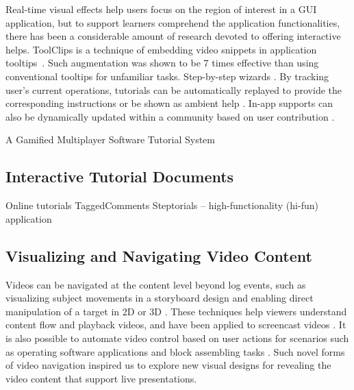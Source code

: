 Real-time visual effects help users focus on the region of interest in a GUI application, but to support learners comprehend the application functionalities, there has been a considerable amount of research devoted to offering interactive helps.
%
ToolClips is a technique of embedding video snippets in application tooltips~\cite{Grossman:2010wr}. Such augmentation was shown to be 7 times effective than using conventional tooltips for unfamiliar tasks. Step-by-step wizards \cite{Bergman:2005:DocWizards,Kelleher:2005:STD:1054972.1055047,Fernquist:2011:SRE:2047196.2047245}.
%
By tracking user's current operations, tutorials can be automatically replayed to provide the corresponding instructions \cite{Pongnumkul:2011ju} or be shown as ambient help \cite{Matejka:2011:AH:1978942.1979349}.
%
In-app supports can also be dynamically updated within a community based on user contribution \cite{Lafreniere:2013ff,Matejka:2009:CCR:1622176.1622214}.

A Gamified Multiplayer Software Tutorial System \cite{Li:2014:CGM:2556288.2556954}


\subsection{Interactive Tutorial Documents}

Online tutorials
TaggedComments \cite{Bunt:2014:TPI:2556288.2557118}
Steptorials \cite{Lieberman:2014:SML:2557500.2557543} -- high-functionality (hi-fun) application




\subsection{Visualizing and Navigating Video Content}
Videos can be navigated at the content level beyond log events, such as visualizing subject movements in a storyboard design \cite{goldman2006schematic} and enabling direct manipulation of a target in 2D \cite{Dragicevic:2008:VBD:1357054.1357096,Goldman:2008:VOA:1449715.1449719,Karrer:2008:DDM:1357054.1357097} or 3D \cite{Nguyen:2013:DMV:2470654.2466150}. These techniques help viewers understand content flow and playback videos, and have been applied to screencast videos \cite{Denoue:2013:RDM:2451176.2451190}. It is also possible to automate video control based on user actions for scenarios such as operating software applications \cite{Pongnumkul:2011ju} and block assembling tasks \cite{Gupta:2012ku}. Such novel forms of video navigation inspired us to explore new visual designs for revealing the video content that support live presentations.

